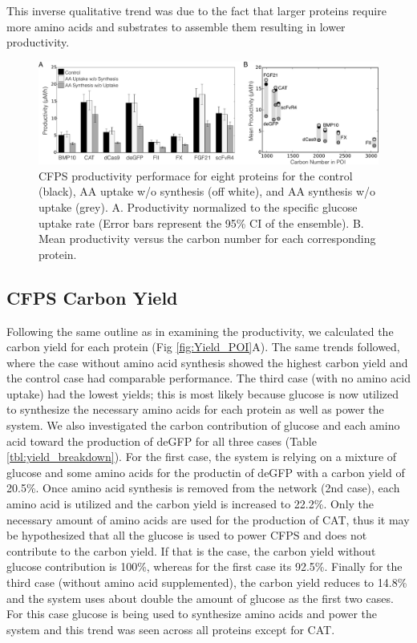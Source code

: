 \documentclass[journal=asbcd6,manuscript=article]{achemso}
\begin{document}
This inverse qualitative trend was due to the fact that larger proteins require more amino acids and substrates to assemble them resulting in lower productivity.
\begin{figure}[t!]
\centering
\includegraphics[width=1.00\textwidth]{./Figures/Prod_POI.pdf}
\caption{CFPS productivity performace for eight proteins for the control (black), AA uptake w/o synthesis (off white), and AA synthesis w/o uptake (grey). A. Productivity normalized to the specific glucose uptake rate (Error bars represent the 95\% CI of the ensemble). B. Mean productivity versus the carbon number for each corresponding protein.}
\label{fig:Prod_POI}
\end{figure}

\subsection{CFPS Carbon Yield}
Following the same outline as in examining the productivity, we calculated the carbon yield for each protein (Fig \ref{fig:Yield_POI}A).
The same trends followed, where the case without amino acid synthesis showed the highest carbon yield and the control case had comparable performance.
The third case (with no amino acid uptake) had the lowest yields; this is most likely because glucose is now utilized to synthesize the necessary amino acids for each protein as well as power the system.
We also investigated the carbon contribution of glucose and each amino acid toward the production of deGFP for all three cases (Table \ref{tbl:yield_breakdown}).
For the first case, the system is relying on a mixture of glucose and some amino acids for the productin of deGFP with a carbon yield of 20.5\%.
Once amino acid synthesis is removed from the network (2nd case), each amino acid is utilized and the carbon yield is increased to 22.2\%.
Only the necessary amount of amino acids are used for the production of CAT, thus it may be hypothesized that all the glucose is used to power CFPS and does not contribute to the carbon yield.
If that is the case, the carbon yield without glucose contribution is 100\%, whereas for the first case its 92.5\%.
Finally for the third case (without amino acid supplemented), the carbon yield reduces to 14.8\% and the system uses about double the amount of glucose as the first two cases.
For this case glucose is being used to synthesize amino acids and power the system and this trend was seen across all proteins except for CAT.
\end{document}
